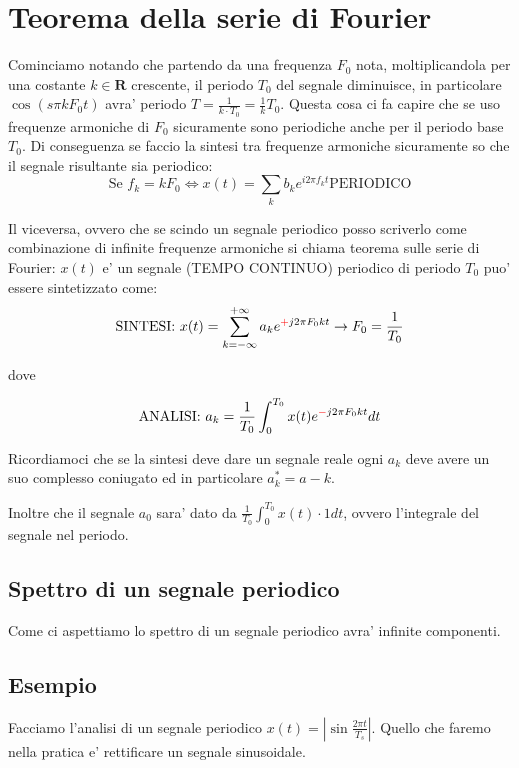\section{Teorema della serie di Fourier}
Cominciamo notando che partendo da una frequenza $F_0$ nota, moltiplicandola per una costante $k \in \mathbf{R}$ crescente, il periodo $T_0$ del segnale diminuisce, in particolare $\cos{(s\pi k F_0 t)}$ avra' periodo $T= \frac{1}{k \cdot T_0} = \frac{1}{k} T_0$.
Questa cosa ci fa capire che se uso frequenze armoniche di $F_0$ sicuramente sono periodiche anche per il periodo base $T_0$. Di conseguenza se faccio la sintesi tra frequenze armoniche sicuramente so che il segnale risultante sia periodico:
\begin{equation}
    \mbox{Se } f_k = k F_0 \Leftrightarrow x(t) = \sum_{k} b_k e^{i 2 \pi f_k t} \mbox{PERIODICO}
\end{equation}

Il viceversa, ovvero che se scindo un segnale periodico posso scriverlo come combinazione di infinite frequenze armoniche si chiama teorema sulle serie di Fourier:
$x(t)$ e' un segnale (TEMPO CONTINUO) periodico di periodo $T_0$ puo' essere sintetizzato come:
\begin{equation}
    \mbox{SINTESI: }x(t) = \sum_{k = - \infty}^{+ \infty} a_k e^{\textcolor{red}{+} j 2\pi F_0 k t} \rightarrow F_0 = \frac{1}{T_0}
\end{equation}

dove

\begin{equation}
    \mbox{ANALISI: } a_k = \frac{1}{T_0} \int_0^{T_0} x(t) e^{\textcolor{red}{-} j 2\pi F_0 k t} dt
\end{equation}

Ricordiamoci che se la sintesi deve dare un segnale reale ogni $a_k$ deve avere un suo complesso coniugato ed in particolare $a_k^* = a-k$.

Inoltre che il segnale $a_0$ sara' dato da $\frac{1}{T_0} \int_0^{T_0} x(t) \cdot 1 dt$, ovvero l'integrale del segnale nel periodo.

\subsection{Spettro di un segnale periodico}
Come ci aspettiamo lo spettro di un segnale periodico avra' infinite componenti.

\subsection{Esempio}
Facciamo l'analisi di un segnale periodico $x(t) = |\sin{\frac{2\pi t}{T_s}}|$.
Quello che faremo nella pratica e' rettificare un segnale sinusoidale.

